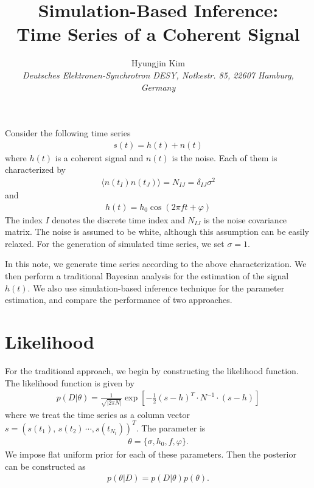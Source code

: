 \documentclass[11pt,a4paper]{article}
\begin{document}
\title{Simulation-Based Inference: 
\\Time Series of a Coherent Signal}
\author{Hyungjin Kim
\\{\it\small Deutsches Elektronen-Synchrotron DESY, Notkestr. 85, 22607 Hamburg, Germany}}
\maketitle

Consider the following time series
\begin{align}
s(t) = h(t) + n(t)
\end{align}
where $h(t)$ is a coherent signal and $n(t)$ is the noise.
Each of them is characterized by
\begin{align}
\langle n(t_I) n(t_J) \rangle = N_{IJ} = \delta_{IJ} \sigma^2
\end{align}
and 
\begin{align}
h(t) = h_0 \cos(2\pi f t + \varphi)
\end{align}
The index $I$ denotes the discrete time index and $N_{IJ}$ is the noise covariance matrix. The noise is assumed to be white, although this assumption can be easily relaxed. For the generation of simulated time series, we set $\sigma=1$. 

In this note, we generate time series according to the above characterization. We then perform a traditional Bayesian analysis for the estimation of the signal $h(t)$. We also use simulation-based inference technique for the parameter estimation, and compare the performance of two approaches. 

\section{Likelihood}
For the traditional approach, we begin by constructing the likelihood function. The likelihood function is given by
\begin{align}
p( D | \theta ) 
= \frac{1}{\sqrt{ | 2 \pi N | }}
\exp\left[
- \frac{1}{2} (s - h)^T
\cdot N^{-1} \cdot (s - h)
\right]
\end{align}
where we treat the time series as a column vector $s = (s(t_1), \, s(t_2) \, \cdots, s(t_{N_t}) )^T$. The parameter is
\begin{align}
\theta = \{ \sigma, h_0, f , \varphi \}.
\end{align}
We impose flat uniform prior for each of these parameters. Then the posterior can be constructed as
\begin{align}
p(\theta | D)
= p(D | \theta) p(\theta) .
\end{align}
\end{document}
